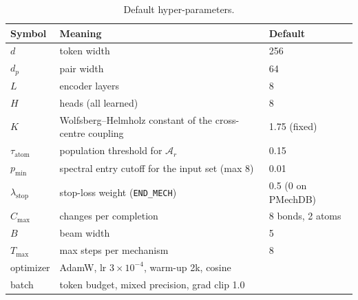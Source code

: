\documentclass[11pt,a4paper]{article}
\begin{document}
\begin{table}[h]
\centering
\caption{Default hyper-parameters.}
\begin{tabular}{lll}
\toprule
Symbol & Meaning & Default\\
\midrule
$d$ & token width & 256\\
$d_p$ & pair width & 64\\
$L$ & encoder layers & 8\\
$H$ & heads (all learned) & 8\\
$K$ & Wolfsberg--Helmholz constant of the cross-centre coupling & 1.75 (fixed)\\
$\tau_{\mathrm{atom}}$ & population threshold for $\mathcal{A}_r$ & 0.15\\
$p_{\min}$ & spectral entry cutoff for the input set (max 8) & 0.01\\
$\lambda_{\mathrm{stop}}$ & stop-loss weight (\texttt{END\_MECH}) & 0.5 (0 on PMechDB)\\
$C_{\max}$ & changes per completion & 8 bonds, 2 atoms\\
$B$ & beam width & 5\\
$T_{\max}$ & max steps per mechanism & 8\\
optimizer & AdamW, lr $3\times10^{-4}$, warm-up 2k, cosine & \\
batch & token budget, mixed precision, grad clip 1.0 & \\
\bottomrule
\end{tabular}
\end{table}
\end{document}
